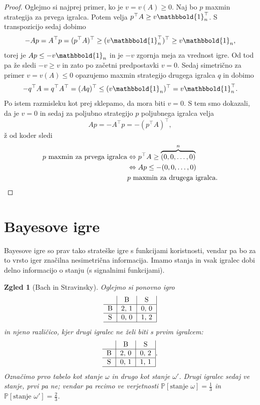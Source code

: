 \documentclass[10pt, a4paper]{article}
\newtheorem{zgled}[izr]{Zgled}
\newenvironment{noticeC}{%
  \tcolorbox[%
  notitle,
  empty,
  enhanced,  %
  breakable,
  coltext=black, 
  fontupper=\rmfamily,
  noparskip,
  sharp corners,
  boxrule=-1pt,  %
  frame hidden,
  left=7pt,  %
  right=7pt,
  top=5pt,
  bottom=5pt,
  before skip=2.5ex plus 2pt,
  after skip=2.5ex plus 2pt,
  overlay unbroken and last={%
  },
  ]}
{\endtcolorbox}
\newenvironment{dokaz}%
  {\begin{noticeC}\begin{proof}}%
  {\end{proof}\end{noticeC}}
\newcommand{\prob}{\mathbb{P}}
\begin{document}
\begin{dokaz}
  Oglejmo si najprej primer, ko je $v = v(A) \geq 0$.
  Naj bo $p$ maxmin strategija za prvega igralca. 
  Potem velja $p^\top A \geq v \mathbbold{1}_n^\top$.
  S transpozicijo sedaj dobimo 
  $$-Ap = A^\top p = (p^\top A)^\top \geq (v \mathbbold{1}_n ^\top)^\top \geq v \mathbbold{1}_n,$$
  torej je $Ap \leq - v\mathbbold{1}_n$ in je $-v$ zgornja 
  meja za vrednost igre. Od tod pa že sledi $-v \geq v$ in zato po začetni predpostavki $v = 0$.
  Sedaj simetrično za primer $v = v(A) \leq 0$ opazujemo maxmin 
  strategijo drugega igralca $q$ in dobimo 
  $$-q^\top A = q^\top A^\top = (A q)^\top \leq (v \mathbbold{1}_n)^\top = v \mathbbold{1}_n^\top.$$
  Po istem razmisleku kot prej sklepamo, da mora biti $v = 0$.
  S tem smo dokazali, da je $v = 0$ in sedaj za poljubno strategijo $p$ poljubnega igralca velja 
  $$A p = - A^\top p = -(p^\top A)^\top,$$ž
  od koder sledi 
  \begin{align*}
    \text{$p$ maxmin za prvega igralca} &\Leftrightarrow p^\top A \geq \overbrace{(0, 0, \dots, 0)}^{n}\\
    &\Leftrightarrow A p \leq -(0, 0, \dots, 0)\\
    & \text{$p$ maxmin za drugega igralca}. \qedhere
  \end{align*}
\end{dokaz}

\section{Bayesove igre}

Bayesove igre so prav tako strateške igre s funkcijami koristnosti, vendar pa bo za to vrsto iger značilna nesimetrična informacija.
Imamo stanja in vsak igralec dobi delno informacijo o stanju (s signalnimi funkcijami).

\begin{zgled}[Bach in Stravinsky]
  Oglejmo si ponovno igro
  $${\begin{tabular}{c|c|c|}
    & B & S\\
    \hline
    B & 2, 1 & 0, 0\\
    \hline
    S & 0, 0 & 1, 2\\
    \hline
\end{tabular}}$$
in njeno različico, kjer drugi igralec ne želi biti s prvim igralcem:
$${\begin{tabular}{c|c|c|}
  & B & S\\
  \hline
  B & 2, 0 & 0, 2\\
  \hline
  S & 0, 1 & 1, 1\\
  \hline
\end{tabular}}.$$
Označimo prvo tabelo kot stanje $\omega$ in drugo kot stanje $\omega'$.
Drugi igralec sedaj ve stanje, prvi pa ne; vendar pa recimo ve verjetnosti $\prob[\text{stanje $\omega$}] = \frac{1}{3}$
in $\prob[\text{stanje $\omega'$}] = \frac{2}{3}$.
\end{zgled}
\end{document}
